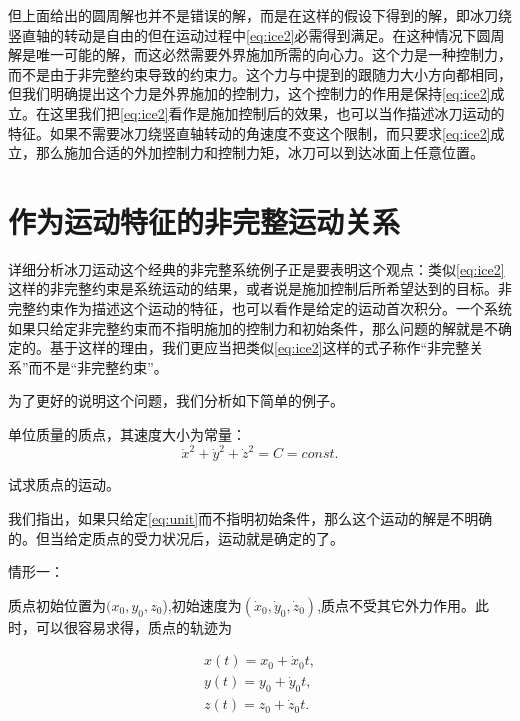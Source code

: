 \documentclass[A4,twoside]{ctexart}
\begin{document}
但上面给出的圆周解也并不是错误的解，而是在这样的假设下得到的解，即冰刀绕竖直轴的转动是自由的但在运动过程中\eqref{eq:ice2}必需得到满足。在这种情况下圆周解是唯一可能的解，而这必然需要外界施加所需的向心力。这个力是一种控制力，而不是由于非完整约束导致的约束力。这个力与\cite{6}中提到的跟随力大小方向都相同，但我们明确提出这个力是外界施加的控制力，这个控制力的作用是保持\eqref{eq:ice2}成立。在这里我们把\eqref{eq:ice2}看作是施加控制后的效果，也可以当作描述冰刀运动的特征。如果不需要冰刀绕竖直轴转动的角速度不变这个限制，而只要求\eqref{eq:ice2}成立，那么施加合适的外加控制力和控制力矩，冰刀可以到达冰面上任意位置。


\section{作为运动特征的非完整运动关系}

详细分析冰刀运动这个经典的非完整系统例子正是要表明这个观点：类似\eqref{eq:ice2}这样的非完整约束是系统运动的结果，或者说是施加控制后所希望达到的目标。非完整约束作为描述这个运动的特征，也可以看作是给定的运动首次积分。一个系统如果只给定非完整约束而不指明施加的控制力和初始条件，那么问题的解就是不确定的。基于这样的理由，我们更应当把类似\eqref{eq:ice2}这样的式子称作“非完整关系”而不是“非完整约束”。

为了更好的说明这个问题，我们分析如下简单的例子。

\begin{example}
\label{ex:unit}
单位质量的质点，其速度大小为常量：
\begin{equation}
  \label{eq:unit}
  \dot{x}^2+\dot{y}^2+\dot{z}^2 = C = const.
\end{equation}

试求质点的运动。


\end{example}

我们指出，如果只给定\eqref{eq:unit}而不指明初始条件，那么这个运动的解是不明确的。但当给定质点的受力状况后，运动就是确定的了。

情形一：

质点初始位置为$(x_0,y_0,z_0$),初始速度为$(\dot{x}_0,\dot{y}_0,\dot{z}_0)$,质点不受其它外力作用。此时，可以很容易求得，质点的轨迹为

\begin{eqnarray}
  \label{eq:unitsol}
  x(t) = x_0 + \dot{x}_0 t,\\
  y(t) = y_0 + \dot{y}_0 t,\\
  z(t) = z_0 + \dot{z}_0 t.
\end{eqnarray}
\end{document}
